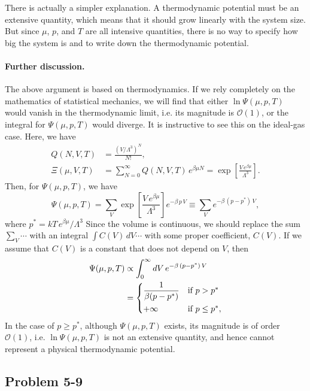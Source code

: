 \documentclass[twocolumn, 10pt]{article}
\numberwithin{equation}{section}
\begin{document}
There is actually a simpler explanation.
%
A thermodynamic potential must be an extensive quantity,
which means that it should grow linearly with the system size.
%
But since $\mu$, $p$, and $T$ are all intensive quantities,
there is no way to specify how big the system is
and to write down the thermodynamic potential.

\paragraph*{Further discussion.}

The above argument is based on thermodynamics.
%
If we rely completely on the mathematics of statistical mechanics,
we will find that either $\ln \Psi(\mu, p, T)$
would vanish in the thermodynamic limit,
i.e. its magnitude is $\mathcal O(1)$,
or the integral for $\Psi(\mu, p, T)$ would diverge.
%
It is instructive to see this on the ideal-gas case.
%
Here, we have
\begin{align*}
  Q(N, V, T)
  &= \frac{(V/\Lambda^3)^N} {N!}, \\
  \Xi(\mu, V, T)
  &= \sum_{N=0}^\infty Q(N, V, T) \, e^{\beta \mu N}
  =
  \exp\left[
    \frac{ V \, e^{\beta \mu} } { \Lambda^3 }
  \right]
  .
\end{align*}
Then, for $\Psi(\mu, p, T)$, we have
$$
\Psi(\mu, p, T)
=\sum_{V}
  \exp\left[
    \frac{ V \, e^{\beta \mu} } { \Lambda^3 }
  \right]
  e^{-\beta \, p \, V}
\equiv
\sum_{V} e^{-\beta \, (p - p^*) \, V},
$$
where $p^* = kT \, e^{\beta \mu}/\Lambda^3$
%
Since the volume is continuous,
we should replace the sum $\sum_V \cdots$
with an integral $\int C(V) \, dV \cdots$
with some proper coefficient, $C(V)$.
%
If we assume that
$C(V)$ is a constant that does not depend on $V$,
then
\begin{align*}
\Psi(\mu, p, T)
&\propto
\int_0^\infty dV \, e^{-\beta \, (p - p^*) \, V}
\\
&=
\begin{dcases}
  \frac{1}{\beta (p - p^*)} & \mbox{if $p > p^*$} \\
  +\infty & \mbox{if $p \le p^*$},
\end{dcases}
\end{align*}
%
In the case of $p \ge p^*$,
although $\Psi(\mu, p, T)$ exists,
its magnitude is of order $\mathcal O(1)$,
i.e. $\ln \Psi(\mu, p, T)$
is not an extensive quantity,
and hence cannot represent a physical thermodynamic potential.


\subsection{Problem 5-9}
\end{document}
